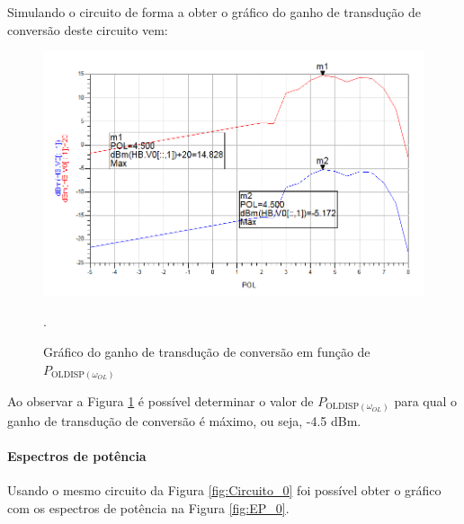 \documentclass[11pt]{article}
\numberwithin{equation}{section}
\begin{document}
Simulando o circuito de forma a obter o gráfico do ganho de transdução de conversão deste circuito vem:

\begin{figure}[h]
\centering
\includegraphics[keepaspectratio=true, scale=0.45]{exps/GT_0}
\vspace{-0.5em}
\caption{Gráfico do ganho de transdução de conversão em função de $ P_{\text{OLDISP}\left(\omega_{OL}\right)} $}.
\vspace{-0.8em}
\label{fig:GT_0}
\end{figure}

Ao observar a Figura \ref{fig:GT_0} é possível determinar o valor de $ P_{\text{OLDISP}\left(\omega_{OL}\right)} $ para qual o ganho de transdução de conversão é máximo, ou seja, -4.5 dBm.

\paragraph{Espectros de potência} \hspace{0pt} 

Usando o mesmo circuito da Figura \ref{fig:Circuito_0} foi possível obter o gráfico com os espectros de potência na Figura \ref{fig:EP_0}.
\end{document}
